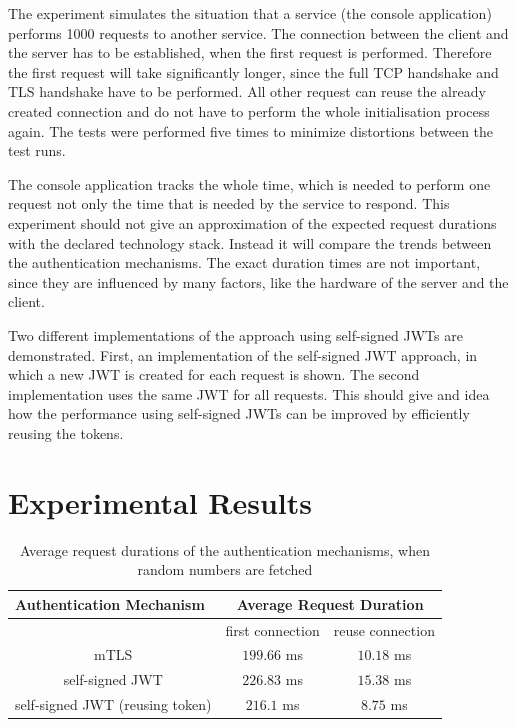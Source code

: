 The experiment simulates the situation that a service (the console application) performs 1000 requests to another service.
The connection between the client and the server has to be established, when the first request is performed.
Therefore the first request will take significantly longer, since the full TCP handshake and TLS handshake have to be performed.
All other request can reuse the already created connection and do not have to perform the whole initialisation process again.
The tests were performed five times to minimize distortions between the test runs.

The console application tracks the whole time, which is needed to perform one request not only the time that is needed by the service to respond.
This experiment should not give an approximation of the expected request durations with the declared technology stack.
Instead it will compare the trends between the authentication mechanisms.
The exact duration times are not important, since they are influenced by many factors, like the hardware of the server and the client.

Two different implementations of the approach using self-signed JWTs are demonstrated.
First, an implementation of the self-signed JWT approach, in which a new JWT is created for each request is shown.
The second implementation uses the same JWT for all requests.
This should give and idea how the performance using self-signed JWTs can be improved by efficiently reusing the tokens.

\section{Experimental Results}


\begin{table}[H]
\begin{tabular}{c|cc}
\multicolumn{1}{l|}{\textbf{Authentication Mechanism}} & \multicolumn{2}{c}{\textbf{Average Request Duration}} \\ \hline
\multicolumn{1}{c|}{} & \multicolumn{1}{c|}{first connection} & reuse connection \\ \hline
mTLS & \multicolumn{1}{c|}{$199.66$ ms} & $10.18$ ms \\ \hline
self-signed JWT & \multicolumn{1}{c|}{$226.83$ ms} & $15.38$ ms \\ \hline
self-signed JWT (reusing token) & \multicolumn{1}{c|}{$216.1$ ms} & $8.75$ ms 
\end{tabular}
\caption{Average request durations of the authentication mechanisms, when random numbers are fetched}
\label{tab:experiment_case_1}
\end{table}

